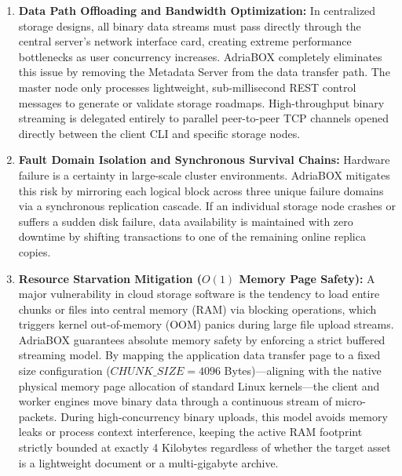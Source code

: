 \begin{enumerate}
    \item \textbf{Data Path Offloading and Bandwidth Optimization:} In centralized storage designs, all binary data streams must pass directly through the central server's network interface card, creating extreme performance bottlenecks as user concurrency increases. AdriaBOX completely eliminates this issue by removing the Metadata Server from the data transfer path. The master node only processes lightweight, sub-millisecond REST control messages to generate or validate storage roadmaps. High-throughput binary streaming is delegated entirely to parallel peer-to-peer TCP channels opened directly between the client CLI and specific storage nodes.
    \item \textbf{Fault Domain Isolation and Synchronous Survival Chains:} Hardware failure is a certainty in large-scale cluster environments. AdriaBOX mitigates this risk by mirroring each logical block across three unique failure domains via a synchronous replication cascade. If an individual storage node crashes or suffers a sudden disk failure, data availability is maintained with zero downtime by shifting transactions to one of the remaining online replica copies.
    \item \textbf{Resource Starvation Mitigation ($O(1)$ Memory Page Safety):} A major vulnerability in cloud storage software is the tendency to load entire chunks or files into central memory (RAM) via blocking operations, which triggers kernel out-of-memory (OOM) panics during large file upload streams. AdriaBOX guarantees absolute memory safety by enforcing a strict buffered streaming model. By mapping the application data transfer page to a fixed size configuration ($CHUNK\_SIZE = 4096$ Bytes)—aligning with the native physical memory page allocation of standard Linux kernels—the client and worker engines move binary data through a continuous stream of micro-packets. During high-concurrency binary uploads, this model avoids memory leaks or process context interference, keeping the active RAM footprint strictly bounded at exactly 4 Kilobytes regardless of whether the target asset is a lightweight document or a multi-gigabyte archive.
\end{enumerate}